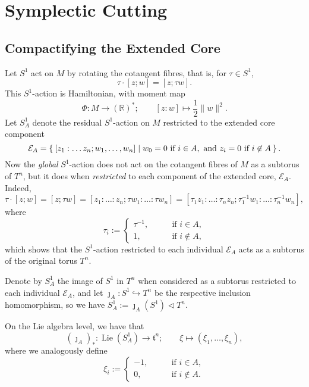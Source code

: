\documentclass{article}
\newcommand{\lra}{\longrightarrow}
\newcommand{\RR}{\mathbb{R}}
\newcommand{\mcE}{\mathcal{E}}
\newcommand{\mft}{\mathfrak{t}}
\DeclareMathOperator{\Lie}{Lie}
\begin{document}
	
	\section{Symplectic Cutting}
	
	\subsection{Compactifying the Extended Core}
	
	Let $S^{1}$ act on $M$ by rotating the cotangent fibres, that is, for $\tau \in S^{1}$,
	\[
		\tau \cdot [z; w] = [z; \tau w].
	\]
	This $S^{1}$-action is Hamiltonian, with moment map
	\[
		\Phi : M \lra (\RR)^{\ast}; \qquad [z:w] \longmapsto \frac{1}{2} \|w\|^{2}.
	\]
	Let $S_{A}^{1}$ denote the residual $S^{1}$-action on $M$ restricted to the extended core component 
	\[
		\mcE_{A} = \Set{ [z_{1}: \ldots z_{n}; w_{1}, \ldots, w_{n}] | w_{0} = 0 \text{ if } i \in A, \text{ and } z_{i} = 0 \text{ if } i \not\in A }.
	\]
	Now the \emph{global }$S^{1}$-action does not act on the cotangent fibres of $M$ as a subtorus of $T^{n}$, but it does when \emph{restricted} to each component of the extended core, $\mcE_{A}$. Indeed,
	\[
		\tau \cdot [z; w] = [z; \tau w] = [z_{1} : \ldots : z_{n} ; \tau w_{1} : \ldots : \tau w_{n} ] = [\tau_{1 }z_{1} : \ldots : \tau_{n}z_{n} ; \tau_{1}^{-1}w_{1} : \ldots : \tau_{n}^{-1} w_{n} ],
	\]
	where
	\[
		\tau_{i} :=
		\begin{cases}
			\tau^{-1}, \qquad &\text{if } i \in A, \\
			1, \qquad &\text{if } i \not\in A,
		\end{cases}
	\]
	which shows that the $S^{1}$-action restricted to each individual $\mcE_{A}$ acts as a subtorus of the original torus $T^{n}$.
	
	Denote by $S_{A}^{1}$ the image of $S^{1}$ in $T^{n}$ when considered as a subtorus restricted to each individual $\mcE_{A}$, and let $\jmath_{A} : S^{1} \hookrightarrow T^{n}$ be the respective inclusion homomorphism, so we have $S_{A}^{1} := \jmath_{A}(S^{1}) \lhd T^{n}$.
	
	On the Lie algebra level, we have that
	\[
		(\jmath_{A})_{\ast} : \Lie(S_{A}^{1})  \lra \mft^{n}; \qquad \xi \longmapsto ( \xi_{1}, \ldots, \xi_{n}),
	\]
	where we analogously define
	\[
		\xi_{i} :=
		\begin{cases}
			-1, \qquad &\text{if } i \in A, \\
			0, \qquad &\text{if } i \not\in A.
		\end{cases}
	\]
	
\end{document}
